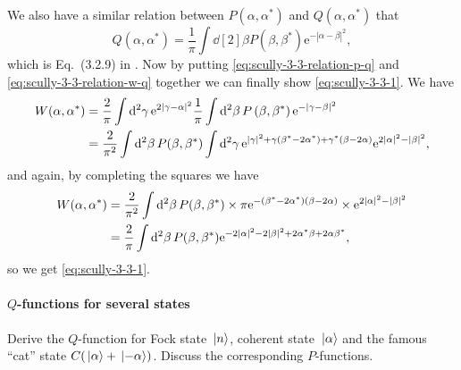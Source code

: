 \documentclass[hyperref, a4paper]{article}
\newcommand*{\ee}{\mathrm{e}}
\begin{document}
We also have a similar relation between $P(\alpha, \alpha^*)$ and $Q(\alpha, \alpha^*)$ that
\begin{equation}
    Q\left(\alpha, \alpha^{*}\right)= \frac{1}{\pi} \int \dd[2]{\beta} P\left(\beta, \beta^{*}\right) \ee^{-|\alpha-\beta|^{2}},
    \label{eq:scully-3-3-relation-p-q}
\end{equation}
which is Eq.~(3.2.9) in \cite{Scully1997}.  
Now by putting \eqref{eq:scully-3-3-relation-p-q} and \eqref{eq:scully-3-3-relation-w-q} together we can finally show \eqref{eq:scully-3-3-1}.
We have
\[
    \begin{aligned}
        W(\alpha, \alpha^*) &= \frac{2}{\pi} \int \dd[2]{\gamma} \ee^{2 \abs{\gamma - \alpha}^2} \frac{1}{\pi} \int \dd[2]{\beta} P\left(\beta, \beta^{*}\right) \ee^{-|\gamma-\beta|^{2}} \\
        &= \frac{2}{\pi^2} \int \dd[2]{\beta} P(\beta, \beta^*) \int \dd[2]{\gamma} \ee^{\abs*{\gamma}^2 + \gamma(\beta^* - 2 \alpha^*) + \gamma^* (\beta - 2\alpha) } \ee^{2\abs*{\alpha}^2 - \abs*{\beta}^2  } ,
    \end{aligned}
\]
and again, by completing the squares we have 
\[
    \begin{aligned}
        W(\alpha, \alpha^*) &= \frac{2}{\pi^2} \int \dd[2]{\beta} P(\beta, \beta^*) \times \pi \ee^{- (\beta^* - 2\alpha^*) (\beta - 2\alpha)} \times \ee^{2\abs*{\alpha}^2 - \abs*{\beta}^2  } \\
        &= \frac{2}{\pi} \int \dd[2]{\beta} P(\beta, \beta^*) \ee^{- 2 \abs*{\alpha}^2 - 2 \abs*{\beta}^2 + 2 \alpha^* \beta + 2 \alpha \beta^*} ,
    \end{aligned}
\]
so we get \eqref{eq:scully-3-3-1}.

\paragraph{}

\paragraph{$Q$-functions for several states} Derive the $Q$-function for Fock state $\ket*{n}$, coherent state $\ket*{\alpha}$ and the famous ``cat'' state $C (\ket*{\alpha} + \ket*{-\alpha})$. Discuss the corresponding $P$-functions.
\end{document}
